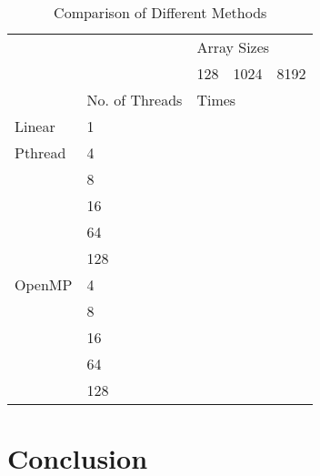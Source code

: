 \documentclass[journal, a4paper]{IEEEtran}
\begin{document}
\begin{table}[H]
\centering
\caption{Comparison of Different Methods}
\label{my-label}
\begin{tabular}{|l|l|l|l|l|}
\hline
\multicolumn{2}{|l|}{\multirow{2}{*}{}} & \multicolumn{3}{l|}{Array Sizes} \\ \cline{3-5} 
\multicolumn{2}{|l|}{}                  & 128      & 1024      & 8192      \\ \hline
                     & No. of Threads   & \multicolumn{3}{l|}{Times}       \\ \hline
Linear               & 1                &          &           &           \\ \hline
Pthread              & 4                &          &           &           \\ \hline
\multirow{4}{*}{}    & 8                &          &           &           \\ \cline{2-5} 
                     & 16               &          &           &           \\ \cline{2-5} 
                     & 64               &          &           &           \\ \cline{2-5} 
                     & 128              &          &           &           \\ \hline
OpenMP               & 4                &          &           &           \\ \hline
\multirow{4}{*}{}    & 8                &          &           &           \\ \cline{2-5} 
                     & 16               &          &           &           \\ \cline{2-5} 
                     & 64               &          &           &           \\ \cline{2-5} 
                     & 128              &          &           &           \\ \hline
\end{tabular}
\end{table}

\section{Conclusion}
	
\end{document}
